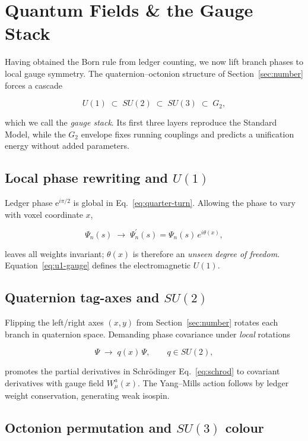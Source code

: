 \section{Quantum Fields \& the Gauge Stack}
\label{sec:gauge}

Having obtained the Born rule from ledger counting, we now lift branch
phases to local gauge symmetry.  The quaternion–octonion structure of
Section~\ref{sec:number} forces a cascade

\[
U(1)\;\subset\;SU(2)\;\subset\;SU(3)\;\subset\;G_2,
\tag{5.1}\label{eq:gauge-tower}
\]

which we call the \emph{gauge stack}.  Its first three layers reproduce
the Standard Model, while the $G_2$ envelope fixes running couplings and
predicts a unification energy without added parameters.

\subsection{Local phase re\-writing and $U(1)$}

Ledger phase $\mathrm e^{i\pi/2}$ is global in
Eq.~\eqref{eq:quarter-turn}.  Allowing the phase to vary with voxel
coordinate $x$,

\[
  \Psi_n(s)\;\longrightarrow\;
  \Psi_n^{\prime}(s)=\Psi_n(s)\,e^{i\theta(x)},
\tag{5.2}\label{eq:u1-gauge}
\]

leaves all weights invariant; $\theta(x)$ is therefore an \emph{unseen
degree of freedom}.  Equation~\eqref{eq:u1-gauge} defines the
electromagnetic $U(1)$.

\subsection{Quaternion tag-axes and $SU(2)$}

Flipping the left/right axes $(x,y)$ from
Section~\ref{sec:number} rotates each branch in quaternion space.
Demanding phase covariance under \emph{local} rotations

\[
  \Psi\;\longrightarrow\;q(x)\,\Psi,\qquad q\in SU(2),
\tag{5.3}
\]

promotes the partial derivatives in Schrödinger
Eq.~\eqref{eq:schrod} to covariant derivatives with gauge field
$W_\mu^{a}(x)$.  The Yang–Mills action follows by ledger weight
conservation, generating weak isospin.

\subsection{Octonion permutation and $SU(3)$ colour}

